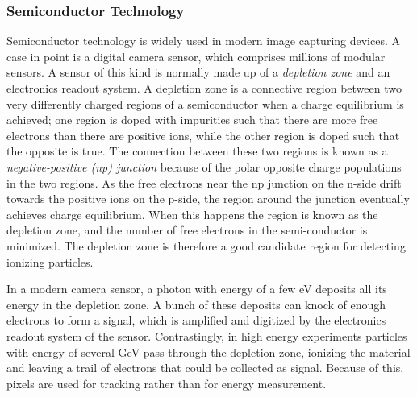 \subsubsection{Semiconductor Technology}
\par Semiconductor technology is widely used in modern image capturing devices. A case in point 
is a digital camera sensor, which comprises millions of modular sensors. A sensor of this kind is normally 
made up of a {\it depletion zone} and an electronics readout system. 
A depletion zone is a connective region between two very differently charged regions of 
a semiconductor when a charge equilibrium is achieved; one region is doped with impurities such that there are more free 
electrons than there are positive ions, while the other region is doped such that the 
opposite is true. The connection between these two regions is known as a {\it negative-positive (np) junction}
because of the polar opposite charge populations in the two regions.  
As the free electrons near the np junction  on the n-side 
drift towards the positive ions on the p-side, the region around the junction 
eventually achieves charge equilibrium. When this happens the region is known as the depletion zone, 
and the number of free electrons in the semi-conductor is minimized. 
The depletion zone is therefore a good candidate region for detecting ionizing particles. 

\par In a modern camera sensor, a photon with energy of a few eV deposits all its energy 
in the depletion zone. A bunch of these deposits can knock of enough electrons to form 
a signal, which is amplified and digitized by the electronics readout system of the sensor. Contrastingly, in high 
energy experiments particles with energy of several GeV pass through the depletion zone, ionizing 
the material and leaving a trail of electrons that could be collected as signal. Because of this, 
pixels are used for tracking rather than for energy measurement.

